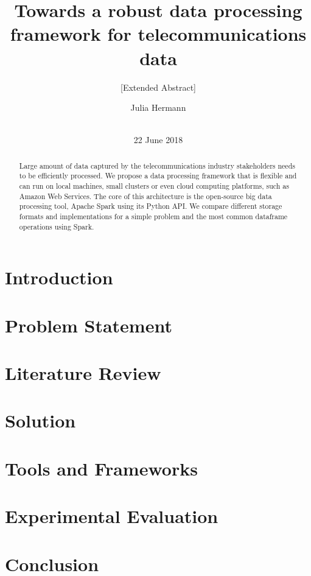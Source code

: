 \documentclass{sig-alternate-05-2015}
\begin{document}
\title{Towards a robust data processing framework for telecommunications data}
\subtitle{[Extended Abstract]}

\author{
\alignauthor
Julia Hermann\\
       \\
}

\maketitle
\date{22 June 2018}
\begin{abstract}
Large amount of data captured by the telecommunications industry stakeholders needs to be efficiently processed. We propose a data processing framework that is flexible and can run on local machines, small clusters or even cloud computing platforms, such as Amazon Web Services. The core of this architecture is the open-source big data processing tool, Apache Spark using its Python API. We compare different storage formats and implementations for a simple problem and the most common dataframe operations using Spark.
\end{abstract}
\section{Introduction}
\section{Problem Statement}
\section{Literature Review}
\section{Solution}
\section{Tools and Frameworks}
\section{Experimental Evaluation}
\section{Conclusion}



\end{document}
